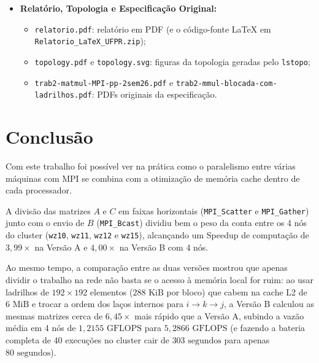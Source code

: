 \documentclass[12pt, a4paper, twoside, chapter=TITLE, subsection=TITLE, section=TITLE, subsubsection=TITLE, english, brazil]{abntex2}
\begin{document}
\begin{itemize}
    \item \textbf{Relatório, Topologia e Especificação Original:}
    \begin{itemize}
        \item \nolinkurl{relatorio.pdf}: relatório em PDF (e o código-fonte LaTeX em \nolinkurl{Relatorio_LaTeX_UFPR.zip});
        \item \nolinkurl{topology.pdf} e \nolinkurl{topology.svg}: figuras da topologia geradas pelo \texttt{lstopo};
        \item \nolinkurl{trab2-matmul-MPI-pp-2sem26.pdf} e \nolinkurl{trab2-mmul-blocada-com-ladrilhos.pdf}: PDFs originais da especificação.
    \end{itemize}
\end{itemize}

\chapter{Conclusão}

Com este trabalho foi possível ver na prática como o paralelismo entre várias máquinas com MPI se combina com a otimização de memória cache dentro de cada processador.

A divisão das matrizes $A$ e $C$ em faixas horizontais (\nolinkurl{MPI_Scatter} e \nolinkurl{MPI_Gather}) junto com o envio de $B$ (\nolinkurl{MPI_Bcast}) dividiu bem o peso da conta entre os 4 nós do cluster (\texttt{wz10}, \texttt{wz11}, \texttt{wz12} e \texttt{wz15}), alcançando um Speedup de computação de $3,99\times$ na Versão A e $4,00\times$ na Versão B com 4 nós.

Ao mesmo tempo, a comparação entre as duas versões mostrou que apenas dividir o trabalho na rede não basta se o acesso à memória local for ruim: ao usar ladrilhos de $192 \times 192$ elementos ($288\text{ KiB}$ por bloco) que cabem na cache L2 de $6\text{ MiB}$ e trocar a ordem dos laços internos para $i \to k \to j$, a Versão B calculou as mesmas matrizes cerca de $6,45\times$ mais rápido que a Versão A, subindo a vazão média em 4 nós de $1,2155\text{ GFLOPS}$ para $5,2866\text{ GFLOPS}$ (e fazendo a bateria completa de 40 execuções no cluster cair de $303\text{ segundos}$ para apenas $80\text{ segundos}$).

\postextual
\end{document}
